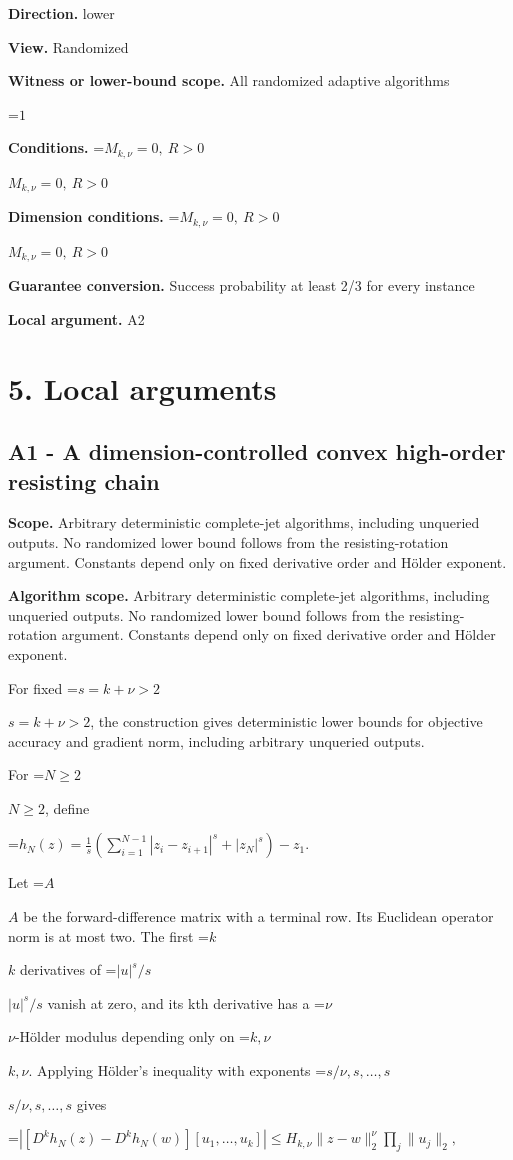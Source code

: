 \documentclass[10pt,a4paper]{article}
\newcommand{\AtlasMath}[1]{\par\begingroup\centering\setbox0=\hbox{$\displaystyle #1$}\ifdim\wd0>1.4\linewidth\typeout{ATLAS WIDE FORMULA: \the\wd0}\fi\ifdim\wd0>\linewidth\resizebox{\linewidth}{!}{\box0}\else\box0\fi\par\endgroup}
\newcommand{\AtlasInlineMath}[1]{\begingroup\setbox0=\hbox{$#1$}\ifdim\wd0>.4\linewidth\endgroup\AtlasMath{#1}\else\endgroup$#1$\fi}
\begin{document}
\textbf{Direction.} lower

\textbf{View.} Randomized

\textbf{Witness or lower-bound scope.} All randomized adaptive algorithms

\AtlasMath{1}
\textbf{Conditions.} \AtlasInlineMath{M_{k,\nu}=0,\ R>0}

\textbf{Dimension conditions.} \AtlasInlineMath{M_{k,\nu}=0,\ R>0}

\textbf{Guarantee conversion.} Success probability at least 2/3 for every instance

\textbf{Local argument.} A2

\section{5. Local arguments}
\subsection{A1 - A dimension-controlled convex high-order resisting chain}
\textbf{Scope.} Arbitrary deterministic complete-jet algorithms, including unqueried outputs. No randomized lower bound follows from the resisting-rotation argument. Constants depend only on fixed derivative order and Hölder exponent.

\textbf{Algorithm scope.} Arbitrary deterministic complete-jet algorithms, including unqueried outputs. No randomized lower bound follows from the resisting-rotation argument. Constants depend only on fixed derivative order and Hölder exponent.

For fixed \AtlasInlineMath{s=k+\nu>2}, the construction gives deterministic lower bounds for objective accuracy and gradient norm, including arbitrary unqueried outputs.

For \AtlasInlineMath{N\ge2}, define

\AtlasMath{h_N(z)=\frac1s\left(\sum_{i=1}^{N-1}|z_i-z_{i+1}|^s+|z_N|^s\right)-z_1.}

Let \AtlasInlineMath{A} be the forward-difference matrix with a terminal row. Its Euclidean operator norm is at most two. The first \AtlasInlineMath{k} derivatives of \AtlasInlineMath{|u|^s/s} vanish at zero, and its kth derivative has a \AtlasInlineMath{\nu}-Hölder modulus depending only on \AtlasInlineMath{k,\nu}. Applying Hölder's inequality with exponents \AtlasInlineMath{s/\nu,s,\ldots,s} gives

\AtlasMath{|[D^kh_N(z)-D^kh_N(w)][u_1,\ldots,u_k]|
\le H_{k,\nu}\|z-w\|_2^\nu\prod_j\|u_j\|_2,}
\end{document}

